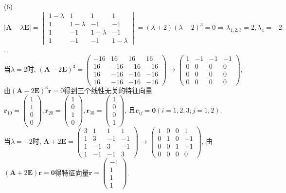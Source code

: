 \documentclass[titlepage,11pt,a4paper,twoside]{report}
\makeatletter
\newenvironment{solve}{\par
	\pushQED{\qed}%
	\normalfont \topsep1\p@\@plus6\p@\relax
	\trivlist
	\item\relax
	{\hspace*{\parindent}{\heiti 解}\@addpunct{:}}\hspace\labelsep\ignorespaces
}{%
	\popQED\endtrivlist\@endpefalse
}
\makeatother
\begin{document}
\begin{solve}
(6)$|\bm{A}-\lambda\bm{E}|=\begin{vmatrix}1-\lambda&1&1&1\\1&1-\lambda&-1&-1\\1&-1&1-\lambda&-1\\1&-1&-1&1-\lambda\end{vmatrix}=(\lambda+2)(\lambda-2)^3=0\Rightarrow\lambda_{1,2,3}=2,\lambda_4=-2$.\\
当$\lambda=2$时, $(\bm{A}-2\bm{E})^3=\begin{pmatrix}-16&16&16&16\\16&-16&-16&-16\\16&-16&-16&-16\\16&-16&-16&-16\end{pmatrix}\to\begin{pmatrix}1&-1&-1&-1\\0&0&0&0\\0&0&0&0\\0&0&0&0\end{pmatrix}$, 由$(\bm{A}-2\bm{E})^3\bm{r}=0$得到三个线性无关的特征向量$\bm{r}_{10}=\begin{pmatrix}1\\1\\0\\0\end{pmatrix},\bm{r}_{20}=\begin{pmatrix}1\\0\\1\\0\end{pmatrix},\bm{r}_{30}=\begin{pmatrix}1\\0\\0\\1\end{pmatrix}$, 	且$\bm{r}_{ij}=\bm{0}(i=1,2,3;j=1,2)$.\\
当$\lambda=-2$时, $\bm{A}+2\bm{E}=\begin{pmatrix}3&1&1&1\\1&3&-1&-1\\1&-1&3&-1\\1&-1&-1&3\end{pmatrix}\to\begin{pmatrix}1&0&0&1\\0&1&0&-1\\0&0&1&-1\\0&0&0&0\end{pmatrix}$, 由$(\bm{A}+2\bm{E})\bm{r}=\bm{0}$得特征向量$\bm{r}=\begin{pmatrix}-1\\1\\1\\1\end{pmatrix}$.\\

\end{solve}
\end{document}
